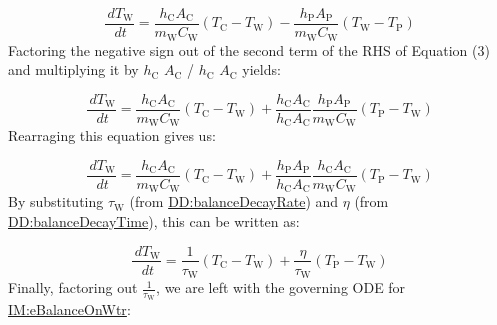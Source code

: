 \documentclass[12pt]{article}
\begin{document}
\begin{displaymath}
\frac{\,d{T_{\text{W}}}}{\,dt}=\frac{{h_{\text{C}}} {A_{\text{C}}}}{{m_{\text{W}}} {C_{\text{W}}}} \left({T_{\text{C}}}-{T_{\text{W}}}\right)-\frac{{h_{\text{P}}} {A_{\text{P}}}}{{m_{\text{W}}} {C_{\text{W}}}} \left({T_{\text{W}}}-{T_{\text{P}}}\right)
\end{displaymath}
Factoring the negative sign out of the second term of the RHS of Equation (3) and multiplying it by ${h_{\text{C}}}$ ${A_{\text{C}}}$ / ${h_{\text{C}}}$ ${A_{\text{C}}}$ yields:

\begin{displaymath}
\frac{\,d{T_{\text{W}}}}{\,dt}=\frac{{h_{\text{C}}} {A_{\text{C}}}}{{m_{\text{W}}} {C_{\text{W}}}} \left({T_{\text{C}}}-{T_{\text{W}}}\right)+\frac{{h_{\text{C}}} {A_{\text{C}}}}{{h_{\text{C}}} {A_{\text{C}}}} \frac{{h_{\text{P}}} {A_{\text{P}}}}{{m_{\text{W}}} {C_{\text{W}}}} \left({T_{\text{P}}}-{T_{\text{W}}}\right)
\end{displaymath}
Rearraging this equation gives us:

\begin{displaymath}
\frac{\,d{T_{\text{W}}}}{\,dt}=\frac{{h_{\text{C}}} {A_{\text{C}}}}{{m_{\text{W}}} {C_{\text{W}}}} \left({T_{\text{C}}}-{T_{\text{W}}}\right)+\frac{{h_{\text{P}}} {A_{\text{P}}}}{{h_{\text{C}}} {A_{\text{C}}}} \frac{{h_{\text{C}}} {A_{\text{C}}}}{{m_{\text{W}}} {C_{\text{W}}}} \left({T_{\text{P}}}-{T_{\text{W}}}\right)
\end{displaymath}
By substituting ${τ_{\text{W}}}$ (from \hyperref[DD:balanceDecayRate]{DD:balanceDecayRate}) and $η$ (from \hyperref[DD:balanceDecayTime]{DD:balanceDecayTime}), this can be written as:

\begin{displaymath}
\frac{\,d{T_{\text{W}}}}{\,dt}=\frac{1}{{τ_{\text{W}}}} \left({T_{\text{C}}}-{T_{\text{W}}}\right)+\frac{η}{{τ_{\text{W}}}} \left({T_{\text{P}}}-{T_{\text{W}}}\right)
\end{displaymath}
Finally, factoring out $\frac{1}{{τ_{\text{W}}}}$, we are left with the governing ODE for \hyperref[IM:eBalanceOnWtr]{IM:eBalanceOnWtr}:
\end{document}
